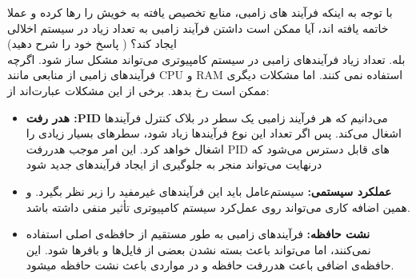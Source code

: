 \documentclass[]{article}
\begin{document}
با توجه به اینکه فرآیند های زامبی، منابع تخصیص یافته به خویش را رها کرده و عملا خاتمه یافته اند، آیا ممکن است داشتن فرآیند زامبی
به تعداد زیاد در سیستم اخلالی ایجاد کند؟ ( پاسخ خود را شرح دهید) \\
بله. تعداد زیاد فرآیند‌های زامبی در سیستم کامپیوتری می‌تواند مشکل ساز شود. اگرچه فرآیند‌های زامبی از منابعی مانند CPU و RAM استفاده نمی کنند.
اما مشکلات دیگری ممکن است رخ بدهد. برخی از این مشکلات عبارت‌اند از:
\vspace{-0.15cm}
\begin{itemize}
    \item \textbf{هدر رفت :PID}
    می‌دانیم که هر فرآیند زامبی یک سطر در بلاک کنترل فرآیند‌ها اشغال می‌کند. پس اگر تعداد این نوع فرآیندها زیاد شود،
    سطرهای بسیار زیادی را اشغال خواهد کرد. این امر موجب هدررفت PID های قابل دسترس می‌شود که درنهایت می‌تواند منجر به جلوگیری از ایجاد فرآیندهای جدید شود
    \item \textbf{عملکرد سیستمی:}
    سیستم‌عامل باید این فرآیند‌های غیرمفید را زیر نظر بگیرد. و همین اضافه کاری می‌تواند روی عمل‌کرد سیستم کامپیوتری تأثیر منفی داشته باشد.
    \item \textbf{نشت حافظه:}
    فرآیند‌های زامبی به طور مستقیم از حافظه‌ی اصلی استفاده نمی‌کنند، اما می‌تواند باعث بسته نشدن بعضی از فایل‌ها و بافر‌ها شود.
    این حافظه‌ی اضافی باعث هدررفت حافظه و در مواردی باعث نشت حافظه میشود.

\end{itemize}
\end{document}
